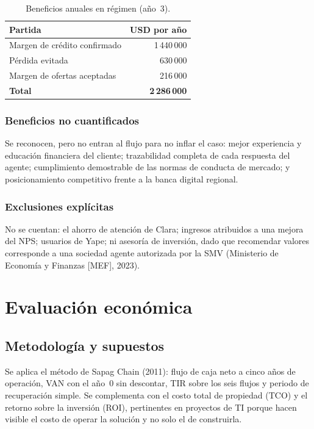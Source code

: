 \documentclass[11pt,a4paper]{article}
\begin{document}
\begin{table}[H]
\centering
\caption{Beneficios anuales en régimen (año~3).}
\small
\begin{tabularx}{0.85\textwidth}{@{}X r@{}}
\toprule
\textbf{Partida} & \textbf{USD por año} \\
\midrule
Margen de crédito confirmado & 1\,440\,000 \\
Pérdida evitada              &   630\,000 \\
Margen de ofertas aceptadas  &   216\,000 \\
\midrule
\textbf{Total} & \textbf{2\,286\,000} \\
\bottomrule
\end{tabularx}
\end{table}

\subsubsection{Beneficios no cuantificados}

Se reconocen, pero no entran al flujo para no inflar el caso: mejor experiencia y educación financiera del cliente; trazabilidad completa de cada respuesta del agente; cumplimiento demostrable de las normas de conducta de mercado; y posicionamiento competitivo frente a la banca digital regional.

\subsubsection{Exclusiones explícitas}

No se cuentan: el ahorro de atención de Clara; ingresos atribuidos a una mejora del NPS; usuarios de Yape; ni asesoría de inversión, dado que recomendar valores corresponde a una sociedad agente autorizada por la SMV (Ministerio de Economía y Finanzas [MEF], 2023).

\clearpage
\section{Evaluación económica}\label{sec:economica}

\subsection{Metodología y supuestos}

Se aplica el método de Sapag Chain (2011): flujo de caja neto a cinco años de operación, VAN con el año~0 sin descontar, TIR sobre los seis flujos y periodo de recuperación simple. Se complementa con el costo total de propiedad (TCO) y el retorno sobre la inversión (ROI), pertinentes en proyectos de TI porque hacen visible el costo de operar la solución y no solo el de construirla.
\end{document}
